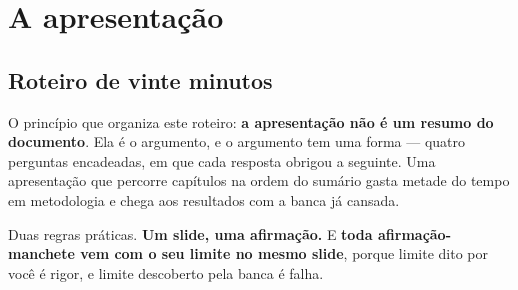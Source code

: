 \part{A apresentação}

\chapter{Roteiro de vinte minutos}

O princípio que organiza este roteiro: \textbf{a apresentação não é um resumo do
documento}. Ela é o argumento, e o argumento tem uma forma --- quatro perguntas
encadeadas, em que cada resposta obrigou a seguinte. Uma apresentação que
percorre capítulos na ordem do sumário gasta metade do tempo em metodologia e
chega aos resultados com a banca já cansada.

Duas regras práticas. \textbf{Um slide, uma afirmação.} E \textbf{toda
afirmação-manchete vem com o seu limite no mesmo slide}, porque limite dito
por você é rigor, e limite descoberto pela banca é falha.

